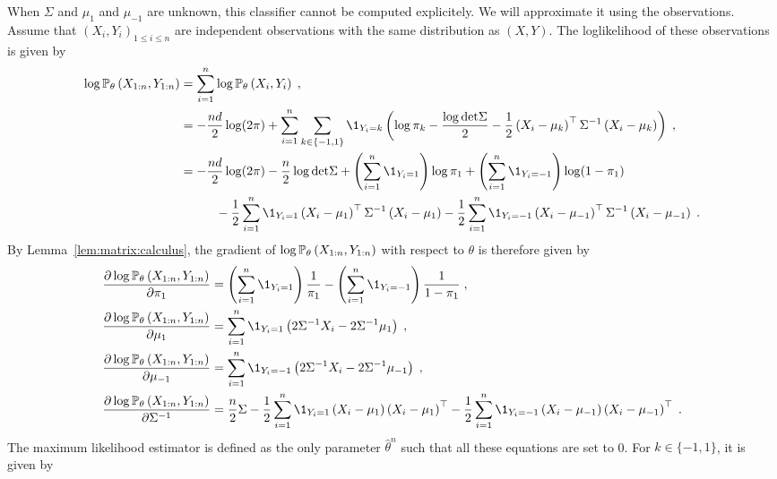 When $\Sigma$ and $\mu_1$ and $\mu_{-1}$ are unknown, this classifier cannot be computed explicitely. We will approximate it using the observations. Assume that  $(X_i,Y_i)_{1\leqslant i\leqslant n}$ are independent observations with the same distribution as $(X,Y)$. The loglikelihood of these observations is given by
\begin{align*}
\log \bP_{\theta}\left(X_{1:n},Y_{1:n}\right) &=\sum_{i=1}^n \log \bP_{\theta} \left(X_{i},Y_{i}\right)\eqsp,\\
&= - \frac{nd}{2} \log(2\pi)+\sum_{i=1}^n\sum_{k\in\{-1,1\}}\1_{Y_i=k}\left(\log \pi_{k} -\frac{\log \det \Sigma}{2} - \frac{1}{2}\left(X_i - \mu_{k}\right)^\top\Sigma^{-1}\left(X_i - \mu_{k}\right)\right) \eqsp,\\
&= - \frac{nd}{2} \log(2\pi)-\frac{n}2 \log\det\Sigma + \left(\sum_{i=1}^n\1_{Y_i=1}\right)\log \pi_1 + \left(\sum_{i=1}^n\1_{Y_i=-1}\right)\log (1-\pi_{1})\\
& \hspace{1cm}-  \frac{1}{2}\sum_{i=1}^n\1_{Y_i=1}\left(X_i - \mu_{1}\right)^\top\Sigma^{-1}\left(X_i - \mu_{1}\right) -  \frac{1}{2}\sum_{i=1}^n\1_{Y_i=-1}\left(X_i - \mu_{-1}\right)^\top\Sigma^{-1}\left(X_i - \mu_{-1}\right)\eqsp.
\end{align*}
By Lemma~\ref{lem:matrix:calculus}, the gradient of $\log \mathbb{P}_{\theta}\left(X_{1:n},Y_{1:n}\right)$ with respect to $\theta$ is therefore given by
\begin{align*}
\frac{\partial \log \bP_{\theta}\left(X_{1:n},Y_{1:n}\right)}{\partial \pi_1} &= \left(\sum_{i=1}^n\1_{Y_i=1}\right)\frac{1}{\pi_1} - \left(\sum_{i=1}^n\1_{Y_i=-1}\right)\frac{1}{1-\pi_{1}}\eqsp,\\
\frac{\partial \log \bP_{\theta}\left(X_{1:n},Y_{1:n}\right)}{\partial \mu_1} &= \sum_{i=1}^n\1_{Y_i=1}\left(2\Sigma^{-1}X_i - 2\Sigma^{-1}\mu_{1}\right)\eqsp,\\
\frac{\partial \log \bP_{\theta}\left(X_{1:n},Y_{1:n}\right)}{\partial \mu_{-1}} &= \sum_{i=1}^n\1_{Y_i=-1}\left(2\Sigma^{-1}X_i - 2\Sigma^{-1}\mu_{-1}\right)\eqsp,\\
\frac{\partial \log \bP_{\theta}\left(X_{1:n},Y_{1:n}\right)}{\partial \Sigma^{-1}} &= \frac{n}{2}\Sigma -  \frac{1}{2}\sum_{i=1}^n\1_{Y_i=1}\left(X_i - \mu_{1}\right)\left(X_i - \mu_{1}\right)^\top -  \frac{1}{2}\sum_{i=1}^n\1_{Y_i=-1}\left(X_i - \mu_{-1}\right)\left(X_i - \mu_{-1}\right)^\top\eqsp.
\end{align*}
The maximum likelihood estimator is defined as the only parameter $\widehat \theta^n$ such that all these equations are set to 0. For $k\in\{-1,1\}$,  it is given by
